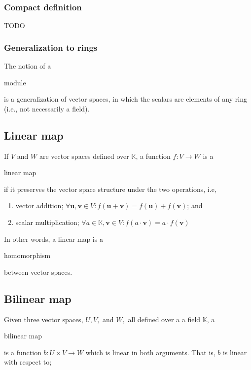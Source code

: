 \documentclass{article}
\newenvironment{enumerated}{ 
\begin{enumerate}
\setlength{\itemsep}{0pt}
\setlength{\parskip}{0pt}
\setlength{\parsep}{0pt}     
}{\end{enumerate}}
\renewcommand{\vec}[1]{\mathbf{#1}}
\begin{document}
\subsubsection*{Compact definition}

TODO

\subsubsection*{Generalization to rings}

The notion of a \begin{em}module\end{em} is a generalization of vector spaces, in which the scalars are elements of any ring (i.e., not necessarily a field).

\subsection*{Linear map}

If $V$ and $W$ are vector spaces defined over $\mathbb{K}$, a function $f : V \rightarrow W$ is a \begin{em}linear map\end{em} if it preserves the vector space structure under the two operations, i.e,

  \begin{enumerated}
    \item vector addition; $ \forall \vec{u}, \vec{v} \in V : f(\vec{u} + \vec{v}) = f(\vec{u}) + f(\vec{v}) $; and
    \item scalar multiplication; $ \forall a \in \mathbb{K}, \vec{v} \in V : f(a \cdot \vec{v}) = a \cdot f(\vec{v}) $
  \end{enumerated}

In other words, a linear map is a \begin{em}homomorphism\end{em} between vector spaces.

\subsection*{Bilinear map}

Given three vector spaces, $U, V, $ and $W,$ all defined over a a field $\mathbb{K}$, a \begin{em}bilinear map\end{em} is a function $b : U \times V \rightarrow W$ which is linear in both arguments. That is, $b$ is linear with respect to;
\end{document}
